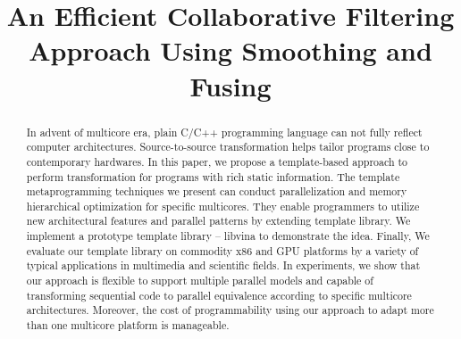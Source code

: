 \documentclass[conference]{IEEEtran}
\begin{document}
\title{An Efficient Collaborative Filtering Approach Using Smoothing and Fusing}


\author{
}

\maketitle


\begin{abstract}
In advent of multicore era, plain C/C++ programming language can not
fully reflect computer architectures. Source-to-source
transformation helps tailor programs close to contemporary
hardwares. In this paper, we propose a template-based approach to perform 
transformation for programs with rich static information.
The template metaprogramming techniques we present can conduct
parallelization and memory hierarchical optimization for specific multicores. They enable
programmers to utilize new architectural
features and parallel patterns by extending template library. 
We implement a prototype template library -- libvina
to demonstrate the idea. Finally, We evaluate our template library on
commodity x86 and GPU platforms by a variety of typical applications
in multimedia and scientific fields. In experiments, we show that our
approach is flexible to support multiple parallel models and capable
of transforming sequential code to parallel equivalence  according to
specific multicore architectures. Moreover, the cost of programmability using our
approach to adapt more than one multicore platform is manageable.
\end{abstract}

\IEEEpeerreviewmaketitle



%
%

%
%
%






\end{document}
